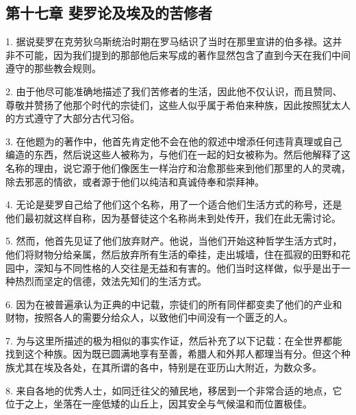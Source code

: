 \subsection{第十七章 斐罗论及埃及的苦修者}

1. 据说斐罗在克劳狄乌斯统治时期在罗马结识了当时在那里宣讲的伯多禄。这并非不可能，因为我们提到的那部他后来写成的著作显然包含了直到今天在我们中间遵守的那些教会规则。\par

2. 由于他尽可能准确地描述了我们苦修者的生活，因此他不仅认识，而且赞同、尊敬并赞扬了他那个时代的宗徒们，这些人似乎属于希伯来种族，因此按照犹太人的方式遵守了大部分古代习俗。\par

3. 在他题为的著作中，他首先肯定他不会在他的叙述中增添任何违背真理或自己编造的东西，然后说这些人被称为，与他们在一起的妇女被称为。然后他解释了这名称的理由，说它源于他们像医生一样治疗和治愈那些来到他们那里的人的灵魂，除去邪恶的情欲，或者源于他们以纯洁和真诚侍奉和崇拜神。\par

4. 无论是斐罗自己给了他们这个名称，用了一个适合他们生活方式的称号，还是他们最初就这样自称，因为基督徒这个名称尚未到处传开，我们在此无需讨论。\par

5. 然而，他首先见证了他们放弃财产。他说，当他们开始这种哲学生活方式时，他们将财物分给亲属，然后放弃所有生活的牵挂，走出城墙，住在孤寂的田野和花园中，深知与不同性格的人交往是无益和有害的。他们当时这样做，似乎是出于一种热烈而坚定的信德，效法先知们的生活方式。\par

6. 因为在被普遍承认为正典的中记载，宗徒们的所有同伴都变卖了他们的产业和财物，按照各人的需要分给众人，以致他们中间没有一个匮乏的人。 \par

7. 为与这里所描述的极为相似的事实作证，然后补充了以下记载：在全世界都能找到这个种族。因为既已圆满地享有至善，希腊人和外邦人都理当有分。但这个种族尤其在埃及各处，在其所谓的各中，特别是在亚历山大附近，为数众多。\par

8. 来自各地的优秀人士，如同迁往父的殖民地，移居到一个非常合适的地点，它位于之上，坐落在一座低矮的山丘上，因其安全与气候温和而位置极佳。\par

